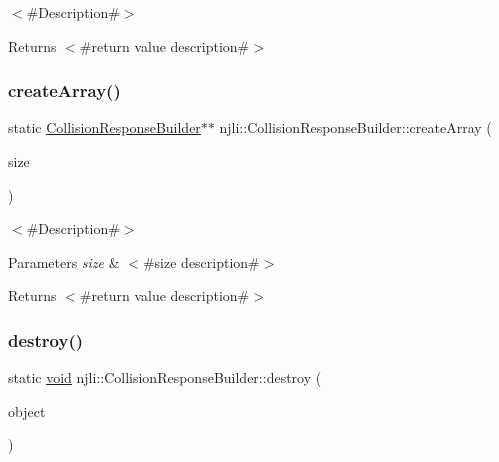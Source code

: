 $<$\#\+Description\#$>$

\begin{DoxyReturn}{Returns}
$<$\#return value description\#$>$ 
\end{DoxyReturn}
\mbox{\label{classnjli_1_1_collision_response_builder_a6aa08e1e478f588b3f7672b84dcf704b}} 
\subsubsection{\texorpdfstring{create\+Array()}{createArray()}}
{\footnotesize\ttfamily static \mbox{\hyperlink{classnjli_1_1_collision_response_builder}{Collision\+Response\+Builder}}$\ast$$\ast$ njli\+::\+Collision\+Response\+Builder\+::create\+Array (\begin{DoxyParamCaption}\item[{const \mbox{\hyperlink{_util_8h_a10e94b422ef0c20dcdec20d31a1f5049}{u32}}}]{size }\end{DoxyParamCaption})\hspace{0.3cm}{\ttfamily [static]}}

$<$\#\+Description\#$>$


\begin{DoxyParams}{Parameters}
{\em size} & $<$\#size description\#$>$\\
\hline
\end{DoxyParams}
\begin{DoxyReturn}{Returns}
$<$\#return value description\#$>$ 
\end{DoxyReturn}
\mbox{\label{classnjli_1_1_collision_response_builder_a3e610ab2c2e7a753796970880f8ee784}} 
\subsubsection{\texorpdfstring{destroy()}{destroy()}}
{\footnotesize\ttfamily static \mbox{\hyperlink{_thread_8h_af1e856da2e658414cb2456cb6f7ebc66}{void}} njli\+::\+Collision\+Response\+Builder\+::destroy (\begin{DoxyParamCaption}\item[{\mbox{\hyperlink{classnjli_1_1_collision_response_builder}{Collision\+Response\+Builder}} $\ast$}]{object }\end{DoxyParamCaption})\hspace{0.3cm}{\ttfamily [static]}}


